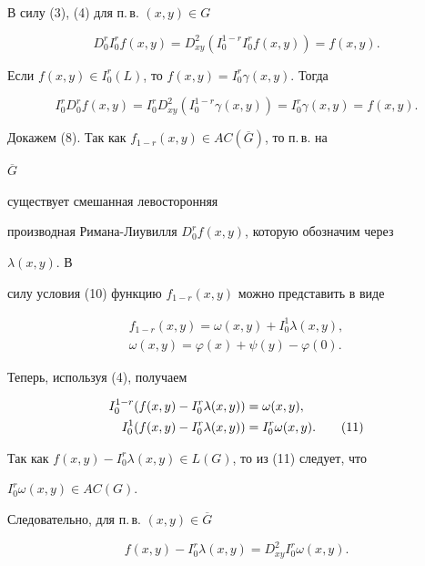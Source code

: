 \begin{pf} В силу (3), (4) для п.\,в. $(x,y)\in G$ 


$$ 


D^r_0I^r_0 f(x,y)=D^2_{xy}(I_0^{1-r}I_0^rf(x,y))=f(x,y). 


$$ 


Если $f(x,y)\in I_0^r(L)$, то $f(x,y)=I_0^r\gamma(x,y)$. Тогда 


$$ 


I_0^rD_0^rf(x,y)=I_0^rD^2_{xy}(I_0^{1-r}\gamma(x,y))= 


I_0^r\gamma(x,y)=f(x,y). 


$$ 


Докажем (8). Так как $f_{1-r}(x,y)\in AC(\overline G)$, то п.\,в. на 


$\overline G$ 


существует смешанная левосторонняя 


производная Римана-Лиувилля $D_0^rf(x,y)$, которую обозначим через 


$\lambda(x,y)$. В 


силу условия (10) функцию $f_{1-r}(x,y)$ можно представить в виде 


\cite{Wal} 


\begin{gather*} 


f_{1-r}(x,y)=\omega(x,y)+I_0^1\lambda(x,y),\\ 


\omega(x,y)=\varphi(x)+\psi(y)-\varphi(0). 


\end{gather*} 


Теперь, используя (4), получаем 


\begin{align} 


I_0^{1-r}(f(x,y)-I_0^r\lambda(x,y)) &=\omega(x,y),\notag\\ 


I_0^1(f(x,y)-I_0^r\lambda(x,y)) &=I_0^r\omega(x,y).\tag{11} 


\end{align} 


Так как $f(x,y)-I_0^r\lambda(x,y)\in L(G)$, то из (11) следует, что 


$I_0^r\omega(x,y)\in AC(G)$. 


Следовательно, для п.\,в. $(x,y)\in\overline G$ 


\begin{equation} 


f(x,y)-I_0^r\lambda(x,y)=D^2_{xy}I_0^r\omega(x,y).\tag{12} 



\end{equation}
\end{pf}
